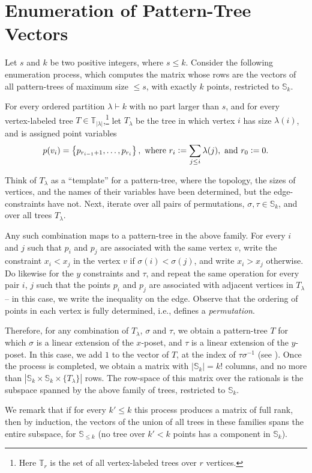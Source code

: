 \documentclass{article}
\newcommand{\eqdef}{\vcentcolon=}
\theoremstyle{remark}
\theoremstyle{plain}
\begin{document}
\label{sect:discussion}
 

\appendix
\section{Enumeration of Pattern-Tree Vectors}
\label{sect:enumeration_pattern_trees}

Let $s$ and $k$  be two positive integers, where $s \le k$. 
Consider the following enumeration process, which computes the matrix
whose rows are the vectors of all pattern-trees  of maximum size $\le s$, with exactly $k$ points, restricted to $\mathbb{S}_k$.


For every ordered partition $\lambda \vdash k$ with no part larger than $s$, and 
for every vertex-labeled tree $T \in \mathbb{T}_{|\lambda|}$,\footnote{Here $\mathbb{T}_r$ is the set of all vertex-labeled trees over $r$ vertices.}
let $T_\lambda$ be the tree in which vertex $i$ has size $\lambda(i)$,
and is assigned point variables 
\[
    p(v_i) = \left\{ p_{r_{i-1} + 1}, \dots, p_{r_i} \right\}, \text{ where } r_i \eqdef \sum_{j \le i} \lambda(j), \text{ and } r_0 \eqdef 0.
\]

Think of $T_\lambda$ as a ``template'' for a pattern-tree, where the topology, the sizes of vertices,
and the names of their variables have been determined, but the edge-constraints have not.
Next, iterate over all pairs of permutations, $\sigma, \tau \in \mathbb{S}_k$, and over all trees $T_\lambda$.

Any such combination maps to a pattern-tree in the above family.
For every $i$ and $j$ such that $p_i$ and $p_j$ are associated with the same vertex $v$,
write the constraint $x_i < x_j$ in the vertex $v$ if $\sigma(i) < \sigma(j)$, and write $x_i > x_j$ otherwise.
Do likewise for the $y$ constraints and $\tau$, and repeat the same operation for every pair $i$, $j$ such that
the points $p_i$ and $p_j$ are associated with adjacent vertices in $T_{\lambda}$ --
in this case, we write the inequality on the edge.
Observe that the ordering of points in each vertex is fully determined, i.e., defines a \textit{permutation}.

Therefore, for any combination of $T_{\lambda}$, $\sigma$ and $\tau$, we obtain a pattern-tree $T$ for which
$\sigma$ is a linear extension of the $x$-poset, and $\tau$ is a linear extension of the $y$-poset.
In this case, we add $1$ to the vector of $T$, at the index of $\tau \sigma^{-1} $ (see ).
Once the process is completed, we obtain a matrix with $|\mathbb{S}_k|=k!$ columns, and no more than
$|\mathbb{S}_k \times \mathbb{S}_k \times \{ T_\lambda \}|$ rows.
The row-space of this matrix over the rationals
is the subspace spanned by the above family of trees, restricted to $\mathbb{S}_k$.

We remark that if for every $k' \le k$ this process produces a matrix of full rank,
then by induction, the vectors of the union of all trees in these families spans the entire subspace,
for $\mathbb{S}_{\le k}$
(no tree over $k' < k$ points has a component in $\mathbb{S}_k$). 
\end{document}
